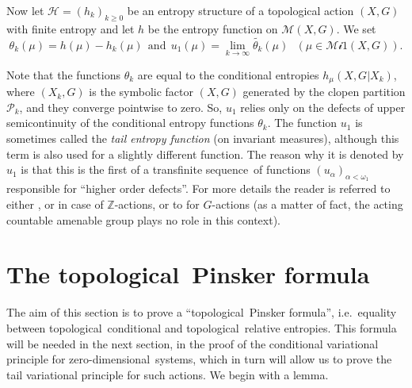\documentclass[12pt]{amsart}
\theoremstyle{definition}
\numberwithin{equation}{section}
\def \Z {\mathbb Z}
\def \H {\mathcal H}
\def \P {\mathcal P}
\def \M {\mathcal M}
\def \sq {sequence}
\def \tl {topological}
\def \im {invariant measure}
\def \zd {zero-dimen\-sio\-nal}
\def \Z {\mathbb Z}
\def \H {\mathcal H}
\def \P {\mathcal P}
\def \M {\mathcal M}
\def \sq {sequence}
\def \tl {topological}
\def \im {invariant measure}
\begin{document}
Now let $\H=(h_k)_{k\ge 0}$ be an entropy structure of a topological action $(X,G)$ with finite entropy and let $h$ be the entropy function on $\M(X,G)$. We set
$$\theta_k (\mu) = h (\mu) - h_k (\mu)\ \ \text{and}\ \ u_1 (\mu) = \lim_{k\rightarrow \infty} \tilde{\theta_k} (\mu)\ \ \ (\mu\in \mathcal{Mi1} (X, G)).$$ 

Note that the functions $\theta_k$ are equal to the conditional entropies $h_\mu(X,G|X_k)$, where $(X_k,G)$ is the symbolic factor $(X,G)$ generated by the clopen partition $\P_k$, and they converge pointwise to zero. So, $u_1$ relies only on the defects of upper semicontinuity of the conditional entropy functions $\theta_k$. The function $u_1$ is sometimes called the \emph{tail entropy function} (on \im s), although this term is also used for a slightly different function. The reason why it is denoted by $u_1$ is that this is the first of a transfinite \sq\ of functions $(u_\alpha)_{\alpha<\omega_1}$ responsible for ``higher order defects''. For more details the reader is referred to either \cite{BD}, \cite{D2005} or \cite{D1} in case of $\Z$-actions, or to \cite{DownarowiczZhang} for $G$-actions (as a matter of fact, the acting countable amenable group plays no role in this context).

\section{The \tl\ Pinsker formula}
The aim of this section is to prove a ``\tl\ Pinsker formula'', i.e.\ equality between \tl\ conditional and \tl\ relative entropies. This formula will be needed in the next section, in the proof of the conditional variational principle for \zd\ systems, which in turn will allow us to prove the tail variational principle for such actions. We begin with a lemma.
\end{document}
